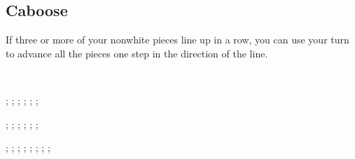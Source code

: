 \documentclass[rulebook.tex]{subfile}
\begin{document}
\subsection*{Caboose}

If three or more of your nonwhite pieces line up in a row,
you can use your turn to advance all the pieces one step in the direction of the line.

\

\begin{center}
\begin{struggleboard}
  ;
  ;
  ;
  ;
  ;
  ;
\end{struggleboard}
\begin{struggleboard}
  ;
  ;
  ;
  ;
  ;
  ;
\end{struggleboard}
\begin{struggleboard}
  ;
  ;
  ;
  ;
  ;
  ;
  ;
  ;
\end{struggleboard}
\end{center}
\end{document}
